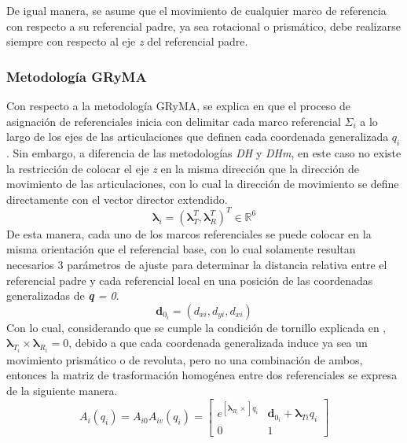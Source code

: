         De igual manera, se asume que el movimiento de cualquier marco de referencia con respecto 
        a su referencial padre, ya sea rotacional o prismático, debe realizarse siempre con respecto 
        al eje \emph{z} del referencial padre.

    \subsubsection{Metodología GRyMA}
        \noindent Con respecto a la metodología GRyMA, se explica en \cite{3DMotion} que el proceso de asignación 
        de referenciales inicia con delimitar cada marco referencial $\Sigma_i$ a lo largo de los ejes 
        de las articulaciones que definen cada coordenada generalizada $q_i$. Sin embargo, a 
        diferencia de las metodologías \emph{DH} y \emph{DHm}, en este caso no existe la 
        restricción de colocar el eje \emph{z} en la misma dirección que la dirección de movimiento de las 
        articulaciones, con lo cual la dirección de movimiento se define directamente con el 
        vector director extendido.
        \begin{equation*}
            \boldsymbol{\lambda}_i = (\boldsymbol{\lambda}^T_T, \boldsymbol{\lambda}^T_R)^T \in \mathbb{R}^6
        \end{equation*}
        De esta manera, cada uno de los marcos referenciales se puede colocar en la misma 
        orientación que el referencial base, con lo cual solamente resultan necesarios 3 
        parámetros de ajuste para determinar la distancia relativa entre el referencial 
        padre y cada referencial local en una posición de las coordenadas generalizadas de 
        \emph{\textbf{q} = 0}.
        \begin{equation*}
            \boldsymbol{d}_{0_i} = (d_{xi}, d_{yi}, d_{xi})
        \end{equation*}
        Con lo cual, considerando que se cumple la condición de tornillo explicada en \cite{3DMotion}, 
        $\boldsymbol{\lambda}_{T_i} \times \boldsymbol{\lambda}_{R_i} = 0$, debido a que cada coordenada generalizada 
        induce ya sea un movimiento prismático o de revoluta, pero no una combinación de ambos, 
        entonces la matriz de trasformación homogénea entre dos referenciales se 
        expresa de la siguiente manera.
        \begin{equation}
            A_i(q_i) = A_{i0} A_{iv}(q_i) = 
            \begin{bmatrix}
                e^{[\boldsymbol{\lambda}_{R_i}\times]q_i} & \boldsymbol{d}_{0_i} + \boldsymbol{\lambda}_{Ti}q_i\\
                0 & 1
            \end{bmatrix}
            \label{eq:TH_GRYMA}
        \end{equation}
